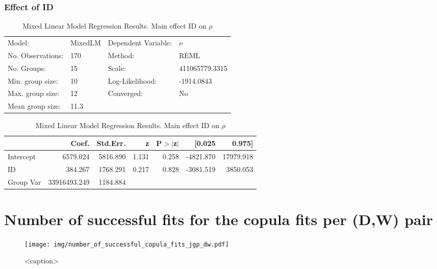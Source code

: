\documentclass{article}
\begin{document}
\subsubsection{Effect of ID}
\begin{table}
    \caption{Mixed Linear Model Regression Results. Main effect ID on $\rho$}
    \label{}
    \begin{center}
    \begin{tabular}{llll}
    \hline
    Model:            & MixedLM & Dependent Variable: & $\nu$         \\
    No. Observations: & 170     & Method:             & REML            \\
    No. Groups:       & 15      & Scale:              & 411065779.3315  \\
    Min. group size:  & 10      & Log-Likelihood:     & -1914.0843      \\
    Max. group size:  & 12      & Converged:          & No              \\
    Mean group size:  & 11.3    &                     &                 \\
    \hline
    \end{tabular}
    \end{center}
    
    \begin{center}
    \begin{tabular}{lrrrrrr}
    \hline
              &        Coef. & Std.Err. &     z & P$> |$z$|$ &    [0.025 &    0.975]  \\
    \hline
    Intercept &     6579.024 & 5816.890 & 1.131 &       0.258 & -4821.870 & 17979.918  \\
    ID        &      384.267 & 1768.291 & 0.217 &       0.828 & -3081.519 &  3850.053  \\
    Group Var & 33916493.249 & 1184.884 &       &             &           &            \\
    \hline
    \end{tabular}
    \end{center}
    \end{table}

\section{Number of successful fits for the copula fits per (D,W) pair}

\begin{figure}[htbp]
    \centering
    \texttt{[image: img/number\_of\_successful\_copula\_fits\_jgp\_dw.pdf]}
    \caption{<caption>}
    \label{<label>}
\end{figure}
\end{document}
